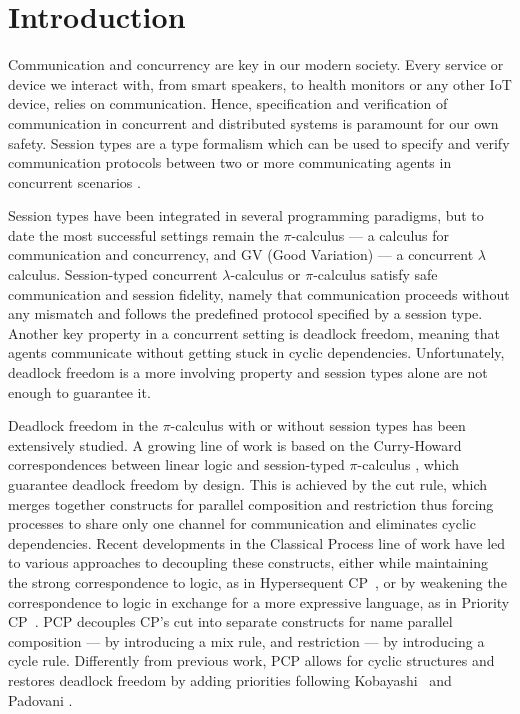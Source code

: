 \documentclass[main.tex]{subfiles}
\begin{document}
\section{Introduction}
Communication and concurrency are key in our modern society. Every service or device we interact with, from smart speakers, to health monitors or any other IoT device, relies on communication. Hence, specification and verification of communication in concurrent and distributed systems is paramount for our own safety. Session types are a type formalism which can be used to specify and verify communication protocols between two or more communicating agents in concurrent scenarios \cite{honda93,takeuchihonda94,hondavasconcelos98,carbonehonda07}.

Session types have been integrated in several programming paradigms, but to date the most successful settings remain the $\pi$-calculus \cite{sangiorgiwalker01} ---  a calculus for communication and concurrency, and GV (Good Variation) \cite{gayvasconcelos10,gayvasconcelos12} ---  a concurrent $\lambda$ calculus.
Session-typed concurrent $\lambda$-calculus or $\pi$-calculus satisfy safe communication and session fidelity, namely that communication proceeds without any mismatch and follows the predefined protocol specified by a session type. Another key property in a concurrent setting is deadlock freedom, meaning that agents communicate without getting stuck in cyclic dependencies. Unfortunately, deadlock freedom is a more involving property and session types alone are not enough to guarantee it.

Deadlock freedom in the $\pi$-calculus with or without session types has been extensively studied. A growing line of work is based on the Curry-Howard correspondences between linear logic and session-typed $\pi$-calculus \cite{cairespfenning10,wadler12}, which guarantee deadlock freedom by design. This is achieved by the cut rule, which merges together constructs for parallel composition and restriction thus forcing processes to share only one channel for communication and eliminates cyclic dependencies. Recent developments in the Classical Process \cite[CP]{wadler12} line of work have led to various approaches to decoupling these constructs, either while maintaining the strong correspondence to logic, as in Hypersequent CP~\cite[HCP]{kokkemontesi19popl,kokkemontesi19tlla}, or by weakening the correspondence to logic in exchange for a more expressive language, as in Priority CP~\cite[PCP]{dardhagay18}. PCP decouples CP's cut into separate constructs for name parallel composition --- by  introducing a mix rule, and restriction --- by introducing a cycle rule. Differently from previous work, PCP allows for cyclic structures and restores deadlock freedom by adding priorities following Kobayashi~\cite{kobayashi06} and Padovani \cite{padovani14}.
\end{document}
